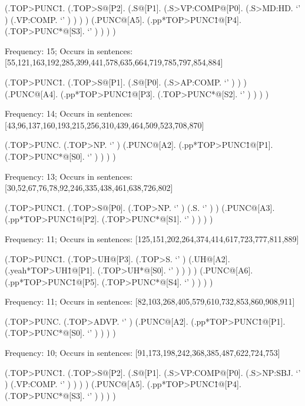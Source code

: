 \documentclass[10pt]{article}
\begin{document}
\begin{parsetree} (.TOP>PUNC\^1. (.TOP>S@[P2]. (.S@[P1]. (.S>VP:COMP@[P0]. (.S>MD:HD. `' ) (.VP:COMP. `' ) ) ) ) (.PUNC@[A5]. (.pp*TOP>PUNC\^1@[P4]. (.TOP>PUNC*@[S3]. `' ) ) ) ) \end{parsetree}

Frequency: 15; Occurs in sentences: [55,121,163,192,285,399,441,578,635,664,719,785,797,854,884]


\begin{parsetree} (.TOP>PUNC\^1. (.TOP>S@[P1]. (.S@[P0]. (.S>AP:COMP. `' ) ) ) (.PUNC@[A4]. (.pp*TOP>PUNC\^1@[P3]. (.TOP>PUNC*@[S2]. `' ) ) ) ) \end{parsetree}

Frequency: 14; Occurs in sentences: [43,96,137,160,193,215,256,310,439,464,509,523,708,870]


\begin{parsetree} (.TOP>PUNC. (.TOP>NP. `' ) (.PUNC@[A2]. (.pp*TOP>PUNC\^1@[P1]. (.TOP>PUNC*@[S0]. `' ) ) ) ) \end{parsetree}

Frequency: 13; Occurs in sentences: [30,52,67,76,78,92,246,335,438,461,638,726,802]


\begin{parsetree} (.TOP>PUNC\^1. (.TOP>S@[P0]. (.TOP>NP. `' ) (.S. `' ) ) (.PUNC@[A3]. (.pp*TOP>PUNC\^1@[P2]. (.TOP>PUNC*@[S1]. `' ) ) ) ) \end{parsetree}

Frequency: 11; Occurs in sentences: [125,151,202,264,374,414,617,723,777,811,889]


\begin{parsetree} (.TOP>PUNC\^1. (.TOP>UH@[P3]. (.TOP>S. `' ) (.UH@[A2]. (.yeah*TOP>UH\^1@[P1]. (.TOP>UH*@[S0]. `' ) ) ) ) (.PUNC@[A6]. (.pp*TOP>PUNC\^1@[P5]. (.TOP>PUNC*@[S4]. `' ) ) ) ) \end{parsetree}

Frequency: 11; Occurs in sentences: [82,103,268,405,579,610,732,853,860,908,911]


\begin{parsetree} (.TOP>PUNC. (.TOP>ADVP. `' ) (.PUNC@[A2]. (.pp*TOP>PUNC\^1@[P1]. (.TOP>PUNC*@[S0]. `' ) ) ) ) \end{parsetree}

Frequency: 10; Occurs in sentences: [91,173,198,242,368,385,487,622,724,753]


\begin{parsetree} (.TOP>PUNC\^1. (.TOP>S@[P2]. (.S@[P1]. (.S>VP:COMP@[P0]. (.S>NP:SBJ. `' ) (.VP:COMP. `' ) ) ) ) (.PUNC@[A5]. (.pp*TOP>PUNC\^1@[P4]. (.TOP>PUNC*@[S3]. `' ) ) ) ) \end{parsetree}
\end{document}
